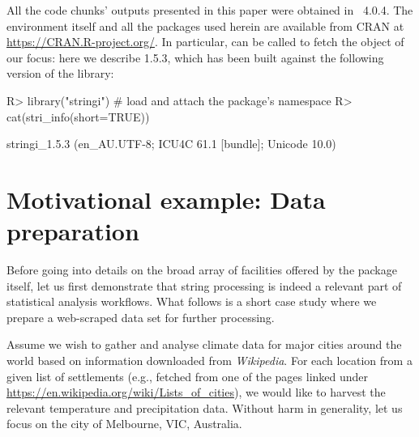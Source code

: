 \documentclass[nojss]{jss}\usepackage[]{graphicx}\usepackage[]{color}
\begin{document}
\medskip
All the code chunks' outputs presented in this paper were obtained in
~4.0.4.
The  environment itself and all the packages used herein
are available from CRAN at \url{https://CRAN.R-project.org/}.
In particular,  can be called to
fetch the object of our focus: here we describe  1.5.3,
which has been built against the following version of the  library:



\begin{Schunk}
\begin{Sinput}
R> library("stringi")  # load and attach the package's namespace
R> cat(stri_info(short=TRUE))
\end{Sinput}
\end{Schunk}

\begin{Schunk}
\begin{Soutput}
stringi_1.5.3 (en_AU.UTF-8; ICU4C 61.1 [bundle]; Unicode 10.0)
\end{Soutput}
\end{Schunk}



\section{Motivational example: Data preparation}\label{Sec:examples}

Before going into details on the broad array of facilities offered by the
 package itself,
let us first demonstrate that string processing is indeed a relevant
part of statistical analysis workflows.
What follows is a short case study where we prepare a web-scraped
data set for further processing.

Assume we wish to gather and analyse
climate data for major cities around the world based on information
downloaded from \textit{Wikipedia}.
For each location from a given list of settlements (e.g.,
fetched from one of the pages linked under
\url{https://en.wikipedia.org/wiki/Lists_of_cities}),
we would like to harvest the relevant temperature and precipitation data.
Without harm in generality, let us focus on the city of Melbourne,
VIC, Australia.
\end{document}
